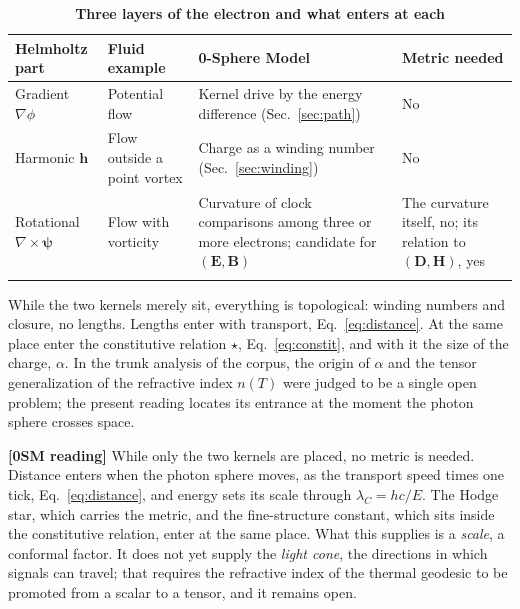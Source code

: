 \documentclass[%
 reprint, amsmath,amssymb, aps, prb, ]{revtex4-2}
\numberwithin{equation}{section}
\newcommand{\hodge}{\star}
\begin{document}
\begin{table}[t!]
\centering
\caption{\textbf{Three layers of the electron and what enters at each}}
\label{tab:layers}
\renewcommand{\arraystretch}{1.4}
\begin{tabular}{p{3.0cm}p{3.6cm}p{4.6cm}p{4.0cm}}
\toprule
\textbf{Helmholtz part} & \textbf{Fluid example} & \textbf{0-Sphere Model} & \textbf{Metric needed} \\
\midrule
Gradient $\nabla\phi$
& Potential flow
& Kernel drive by the energy difference (Sec.~\ref{sec:path})
& No \\
\addlinespace[0.3cm]
Harmonic $\mathbf{h}$
& Flow outside a point vortex
& Charge as a winding number (Sec.~\ref{sec:winding})
& No \\
\addlinespace[0.3cm]
Rotational $\nabla\times\bm{\psi}$
& Flow with vorticity
& Curvature of clock comparisons among three or more electrons; candidate for $(\mathbf{E},\mathbf{B})$
& The curvature itself, no; its relation to $(\mathbf{D},\mathbf{H})$, yes \\
\addlinespace[0.2cm]
\bottomrule
\end{tabular}
\vspace{0.2cm}
\begin{minipage}{0.95\textwidth}
\justifying\footnotesize
While the two kernels merely sit, everything is topological: winding numbers and closure, no lengths. Lengths enter with transport, Eq.~\eqref{eq:distance}. At the same place enter the constitutive relation $\hodge$, Eq.~\eqref{eq:constit}, and with it the size of the charge, $\alpha$. In the trunk analysis of the corpus, the origin of $\alpha$ and the tensor generalization of the refractive index $n(T)$ were judged to be a single open problem; the present reading locates its entrance at the moment the photon sphere crosses space.
\end{minipage}
\end{table}

\textbf{[0SM reading]} While only the two kernels are placed, no metric is needed. Distance enters when the photon sphere moves, as the transport speed times one tick, Eq.~\eqref{eq:distance}, and energy sets its scale through $\lambda_C=hc/E$. The Hodge star, which carries the metric, and the fine-structure constant, which sits inside the constitutive relation, enter at the same place. What this supplies is a \emph{scale}, a conformal factor. It does not yet supply the \emph{light cone}, the directions in which signals can travel; that requires the refractive index of the thermal geodesic to be promoted from a scalar to a tensor, and it remains open.
\end{document}
